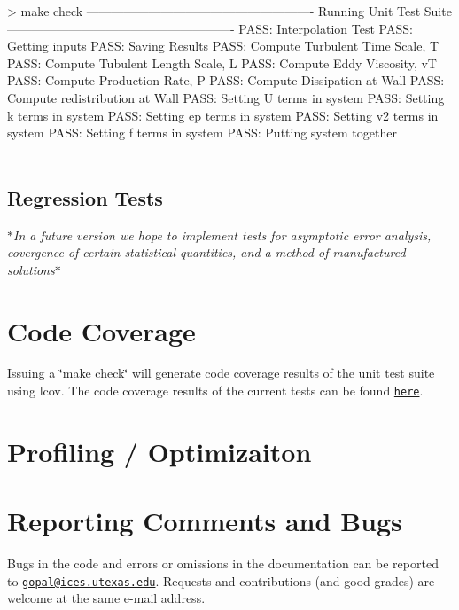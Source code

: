 \begin{DoxyPre} > make check
-------------------------------------------------------
Running Unit Test Suite
-------------------------------------------------------
PASS: Interpolation Test
PASS: Getting inputs
PASS: Saving Results
PASS: Compute Turbulent Time Scale, T
PASS: Compute Tubulent Length Scale, L
PASS: Compute Eddy Viscosity, vT
PASS: Compute Production Rate, P
PASS: Compute Dissipation at Wall
PASS: Compute redistribution at Wall
PASS: Setting U terms in system
PASS: Setting k terms in system
PASS: Setting ep terms in system
PASS: Setting v2 terms in system
PASS: Setting f terms in system
PASS: Putting system together 
-------------------------------------------------------
 \end{DoxyPre}
\hypertarget{index_regression}{}\subsection{Regression Tests}\label{index_regression}
{\itshape $\ast$In a future version we hope to implement tests for asymptotic error analysis, covergence of certain statistical quantities, and a method of manufactured solutions\/}$\ast$\hypertarget{index_coverage}{}\section{Code Coverage}\label{index_coverage}
Issuing a \char`\"{}make check\char`\"{} will generate code coverage results of the unit test suite using lcov. The code coverage results of the current tests can be found \href{http://users.ices.utexas.edu/~gopal/v2f/lcov_html/}{\tt here}.\hypertarget{index_opt}{}\section{Profiling / Optimizaiton}\label{index_opt}
\hypertarget{index_bugs}{}\section{Reporting Comments and Bugs}\label{index_bugs}
Bugs in the code and errors or omissions in the documentation can be reported to \href{mailto:gopal@ices.utexas.edu}{\tt gopal@ices.utexas.edu}. Requests and contributions (and good grades) are welcome at the same e-\/mail address. 